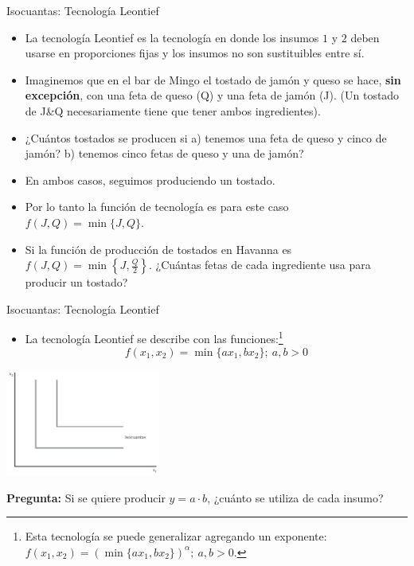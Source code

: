 \documentclass{beamer}
\theoremstyle{definition}
\begin{document}
\begin{frame}{Isocuantas: Tecnología Leontief}
\begin{itemize}
\item La tecnología Leontief es la tecnología en donde los insumos $1$ y $2$ deben usarse en proporciones fijas y los insumos no son sustituibles entre sí. 
\item Imaginemos que en el bar de Mingo el tostado de jamón y queso se hace, \textbf{sin excepción}, con una feta de queso (Q) y una feta de jamón (J). (Un tostado de J\&Q necesariamente tiene que tener ambos ingredientes).
\item ¿Cuántos tostados se producen si a) tenemos una feta de queso y cinco de jamón? b) tenemos cinco fetas de queso y una de jamón?
	\item En ambos casos, seguimos produciendo un tostado.

\item Por lo tanto la función de tecnología es para este caso $f(J,Q)=\min\{J,Q\}$.

\item Si la función de producción de tostados en Havanna es $f(J,Q)=\min\left\{J,\frac{Q}{2}\right\}$. ¿Cuántas fetas de cada ingrediente usa para producir un tostado?


\end{itemize}
\end{frame}

\begin{frame}{Isocuantas: Tecnología Leontief}
\begin{itemize}
\item La tecnología Leontief se describe con las funciones:\footnote{Esta tecnología se puede generalizar agregando un exponente: $f(x_{1},x_{2})=\left(\min\lbrace ax_{1},bx_{2}\rbrace\right)^{\alpha}; \ a,b>0$.}
$$f(x_{1},x_{2})=\min\lbrace ax_{1},bx_{2}\rbrace; \ a,b>0$$
\end{itemize}	
\begin{center}
\includegraphics[width=2in]{figures2/leontief.png}
\end{center}
\textbf{Pregunta:} Si se quiere producir $y=a\cdot b$, ¿cuánto se utiliza de cada insumo? 
\end{frame}
\end{document}
